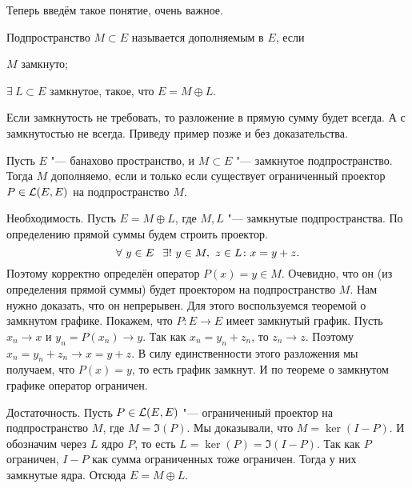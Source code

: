 Теперь введём такое понятие, очень важное.
\begin{Def}
Подпространство $M\subset E$ называется дополняемым в $E$, если 
\begin{roItems}
  \item $M$ замкнуто;
  \item $\exists\ L\subset E$ замкнутое, такое, что $E = M\oplus L$.
\end{roItems}
\end{Def}
Если замкнутость не требовать, то разложение в прямую сумму будет всегда. А с замкнутостью не всегда. Приведу пример позже и без доказательства.
\begin{The}
  Пусть $E$ "--- банахово пространство, и $M\subset E$ "--- замкнутое подпространство. Тогда $M$ дополняемо, если и только если существует ограниченный проектор $P\in\mathcal L(E,E)$ на подпространство $M$.
\end{The}
\begin{Proof}
  Необходимость. Пусть $E = M\oplus L$, где $M,L$ "--- замкнутые подпространства. По определению прямой суммы будем строить проектор.
\[
  \forall\ y\in E\pau \exists !\ y\in M,\ z\in L\colon x = y+ z.
\]
Поэтому корректно определён оператор $P(x) = y\in M$. Очевидно, что он (из определения прямой суммы) будет проектором на подпространство $M$. Нам нужно доказать, что он непрерывен. Для этого воспользуемся теоремой о замкнутом графике. Покажем, что $P\colon E\to E$ имеет замкнутый график. Пусть $x_n\to x$ и $y_n = P(x_n)\to y$. Так как $x_n = y_n + z_n$, то $z_n\to z$. Поэтому $x_n = y_n + z_n\to x = y+ z$. В силу единственности этого разложения мы получаем, что $P(x) = y$, то есть график замкнут. И по теореме о замкнутом графике оператор ограничен.

Достаточность. Пусть $P\in \mathcal L(E,E)$ "--- ограниченный проектор на подпространство $M$, где $M = \Im(P)$. Мы доказывали, что $M = \ker(I-P)$. И обозначим через $L$ ядро $P$, то есть 
$L = \ker(P) = \Im(I-P)$. Так как $P$ ограничен, $I-P$ как сумма ограниченных тоже ограничен. Тогда у них замкнутые ядра. Отсюда $E = M\oplus L$.
\end{Proof}


